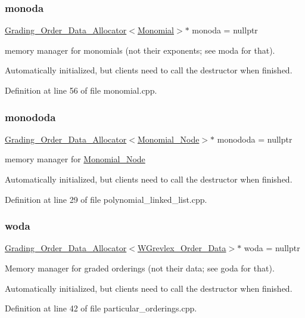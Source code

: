 \mbox{\label{group__memorygroup_ga76b5ae808895658b417e3f3a13c60e51}} 
\subsubsection{\texorpdfstring{monoda}{monoda}}
{\footnotesize\ttfamily \hyperlink{group__memorygroup_class_grading___order___data___allocator}{Grading\+\_\+\+Order\+\_\+\+Data\+\_\+\+Allocator}$<$\hyperlink{group__polygroup_class_monomial}{Monomial}$>$$\ast$ monoda = nullptr}



memory manager for monomials (not their exponents; see moda for that). 

Automatically initialized, but clients need to call the destructor when finished. 

Definition at line 56 of file monomial.\+cpp.

\mbox{\label{group__memorygroup_ga2b5eeb775f6c601e624b487f3245983a}} 
\subsubsection{\texorpdfstring{monododa}{monododa}}
{\footnotesize\ttfamily \hyperlink{group__memorygroup_class_grading___order___data___allocator}{Grading\+\_\+\+Order\+\_\+\+Data\+\_\+\+Allocator}$<$\hyperlink{group__polygroup_class_monomial___node}{Monomial\+\_\+\+Node}$>$$\ast$ monododa = nullptr}



memory manager for \hyperlink{group__polygroup_class_monomial___node}{Monomial\+\_\+\+Node} 

Automatically initialized, but clients need to call the destructor when finished. 

Definition at line 29 of file polynomial\+\_\+linked\+\_\+list.\+cpp.

\mbox{\label{group__memorygroup_ga929e61b883d430fc6909a80fdb9ebb83}} 
\subsubsection{\texorpdfstring{woda}{woda}}
{\footnotesize\ttfamily \hyperlink{group__memorygroup_class_grading___order___data___allocator}{Grading\+\_\+\+Order\+\_\+\+Data\+\_\+\+Allocator}$<$\hyperlink{group__orderinggroup_class_w_grevlex___order___data}{W\+Grevlex\+\_\+\+Order\+\_\+\+Data}$>$$\ast$ woda = nullptr}



Memory manager for graded orderings (not their data; see goda for that). 

Automatically initialized, but clients need to call the destructor when finished. 

Definition at line 42 of file particular\+\_\+orderings.\+cpp.

